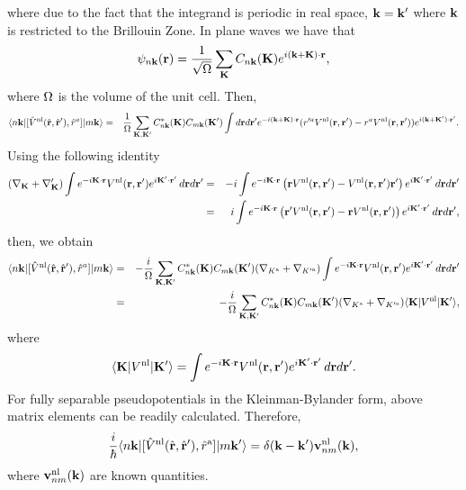 where due to the fact that the integrand is periodic in real space,
$\mathbf{k}=\mathbf{k}'$ where $\mathbf{k}$ is restricted to the Brillouin Zone.
In plane waves we have that
\begin{eqnarray}\label{cn3}
\psi_{n\mathbf{k}}(\mathbf{r})=\frac{1}{\sqrt{\Omega}}
\sum_{\mathbf{K}} C_{n\mathbf{k}}(\mathbf{K})e^{i(\mathbf{k}+\mathbf{K})\cdot\mathbf{r}}
,
\end{eqnarray}
where $\Omega$ is the volume of the unit cell.
Then,
\begin{eqnarray}\label{cn4}
\langle n\mathbf{k} |[\hat V^{\mathrm{nl}}(\hat{\mathbf{r}},\hat{\mathbf{r}}'),\hat r^a]| m\mathbf{k} \rangle
&=&
\frac{1}{\Omega}
\sum_{\mathbf{K},\mathbf{K}'} 
C^*_{n\mathbf{k}}(\mathbf{K}) 
C_{m\mathbf{k}}(\mathbf{K}')
\int d\mathbf{r} d\mathbf{r}' 
e^{-i(\mathbf{k}+\mathbf{K})\cdot \mathbf{r}}
 ( 
r'^a V^{\mathrm{nl}}(\mathbf{r},\mathbf{r}')
- 
r^aV^{\mathrm{nl}}(\mathbf{r},\mathbf{r}')
) 
e^{i(\mathbf{k}+\mathbf{K}')\cdot \mathbf{r}'}
.
\nonumber\\
\end{eqnarray} 
Using the following identity 
\begin{eqnarray}\label{cn5}
(\nabla_{\mathbf{K}}+\nabla_{\mathbf{K}}')
\int e^{-i\mathbf{K}\cdot\mathbf{r}}
V^{\mathrm{nl}}(\mathbf{r},\mathbf{r}')
e^{i\mathbf{K}'\cdot\mathbf{r}'}
\,d\mathbf{r} d\mathbf{r}'
&=&
-i
\int e^{-i\mathbf{K}\cdot\mathbf{r}}
\left(
\mathbf{r}
V^{\mathrm{nl}}(\mathbf{r},\mathbf{r}')
-
V^{\mathrm{nl}}(\mathbf{r},\mathbf{r}')
\mathbf{r}'
\right)
e^{i\mathbf{K}'\cdot\mathbf{r}'}
\,d\mathbf{r} d\mathbf{r}'
\nonumber\\
&=&
i
\int e^{-i\mathbf{K}\cdot\mathbf{r}}
\left(
\mathbf{r}'
V^{\mathrm{nl}}(\mathbf{r},\mathbf{r}')
-
\mathbf{r}
 V^{\mathrm{nl}}(\mathbf{r},\mathbf{r}')
\right)
e^{i\mathbf{K}'\cdot\mathbf{r}'}
\,d\mathbf{r} d\mathbf{r}'
,
\nonumber\\
\end{eqnarray}
then, we obtain
\begin{eqnarray}\label{cn5}
\langle n\mathbf{k} |[\hat V^{\mathrm{nl}}(\hat{\mathbf{r}},\hat{\mathbf{r}}'),\hat r^a]| m\mathbf{k} \rangle
&=&
-\frac{i}{\Omega}
\sum_{\mathbf{K},\mathbf{K}'}
C^*_{n\mathbf{k}}(\mathbf{K})
C_{m\mathbf{k}}(\mathbf{K}')
(\nabla_{K^{\mathrm{a}}}+\nabla_{K'^{\mathrm{a}}})
\int e^{-i\mathbf{K}\cdot\mathbf{r}}
V^{\mathrm{nl}}(\mathbf{r},\mathbf{r}')
e^{i\mathbf{K}'\cdot\mathbf{r}'}
\,d\mathbf{r} d\mathbf{r}'
\nonumber\\
&=&
-\frac{i}{\Omega}
\sum_{\mathbf{K},\mathbf{K}'}
C^*_{n\mathbf{k}}(\mathbf{K})
C_{m\mathbf{k}}(\mathbf{K}')
(\nabla_{K^{\mathrm{a}}}+\nabla_{K'^{\mathrm{a}}})
\langle \mathbf{K} | 
V^{\mathrm{nl}}
| \mathbf{K}' \rangle 
,
\end{eqnarray}
where
\begin{eqnarray}\label{cn6}
\langle \mathbf{K} | 
V^{\mathrm{nl}}
| \mathbf{K}' \rangle 
=
\int e^{-i\mathbf{K}\cdot\mathbf{r}}
V^{\mathrm{nl}}(\mathbf{r},\mathbf{r}')
e^{i\mathbf{K}'\cdot\mathbf{r}'}
\,d\mathbf{r} d\mathbf{r}'
.
\end{eqnarray}
For fully  separable pseudopotentials in the 
Kleinman-Bylander form,\cite{mottaCMS10,kleinmanPRL82,adolphPRB96}
above matrix elements 
can be readily calculated.\cite{francesco}
Therefore,
\begin{eqnarray}\label{cn8}
\frac{i}{\hbar}
\langle n\mathbf{k} |[\hat V^{\mathrm{nl}}(\hat{\mathbf{r}},\hat{\mathbf{r}}'),\hat r^{\mathrm{a}}]| m\mathbf{k}' \rangle
=\delta(\mathbf{k}-\mathbf{k}') \mathbf{v}^{\mathrm{nl}}_{nm}(\mathbf{k})
,
\end{eqnarray}
where $\mathbf{v}^{\mathrm{nl}}_{nm}(\mathbf{k})$ are known quantities.


